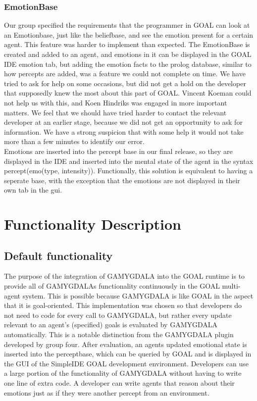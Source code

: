 \documentclass[11pt]{article}
\begin{document}
\subsubsection*{EmotionBase}
Our group specified the requirements that the programmer in GOAL can look at an Emotionbase, just like the beliefbase, and see the emotion present for a certain agent. This feature was harder to implement than expected. The EmotionBase is created and added to an agent, and emotions in it can be displayed in the GOAL IDE emotion tab, but adding the emotion facts to the prolog database, similar to how percepts are added, was a feature we could not complete on time. We have tried to ask for help on some occasions, but did not get a hold on the developer that supposedly knew the most about this part of GOAL. Vincent Koeman could not help us with this, and Koen Hindriks was engaged in more important matters. We feel that we should have tried harder to contact the relevant developer at an earlier stage, because we did not get an opportunity to ask for information. We have a strong suspicion that with some help it would not take more than a few minutes to identify our error.\\
Emotions are inserted into the percept base in our final release, so they are displayed in the IDE and inserted into the mental state of the agent in the syntax percept(emo(type, intensity)). Functionally, this solution is equivalent to having a seperate base, with the exception that the emotions are not displayed in their own tab in the gui. 


\section{Functionality Description}
\subsection{Default functionality}
The purpose of the integration of GAMYGDALA into the GOAL runtime is to provide all of GAMYGDALAs functionality continuously in the GOAL multi-agent system. This is possible because GAMYGDALA is like GOAL in the aspect that it is goal-oriented. This implementation was chosen so that developers do not need to code for every call to GAMYGDALA, but rather every update relevant to an agent's (specified) goals is evaluated by GAMYGDALA automatically. This is a notable distinction from the GAMYGDALA plugin developed by group four. After evaluation, an agents updated emotional state is inserted into the perceptbase, which can be queried by GOAL and is displayed in the GUI of the SimpleIDE GOAL development environment. Developers can use a large portion of the functionality of GAMYGDALA without having to write one line of extra code. A developer can write agents that reason about their emotions just as if they were another percept from an environment.
\end{document}
